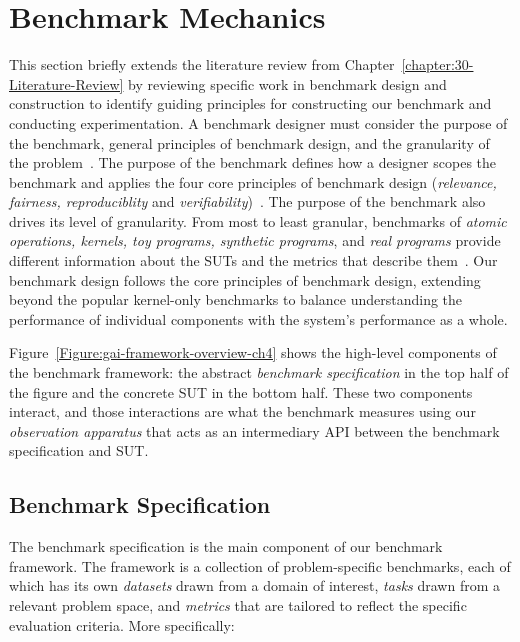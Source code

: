 \section{Benchmark Mechanics}
\label{section:42-GAI-Background}
This section briefly extends the literature review from Chapter~\ref{chapter:30-Literature-Review} by reviewing specific work in benchmark design and construction to identify guiding principles for constructing our benchmark and conducting experimentation. 
A benchmark designer must consider the purpose of the benchmark, general principles of benchmark design, and the granularity of the problem~\cite{Carpinetti2002}.
The purpose of the benchmark defines how a designer scopes the benchmark and applies the four core principles of benchmark design (\textit{relevance, fairness, reproduciblity} and \textit{verifiability})~\cite{Huppler2009, Kistowski2015}. 
The purpose of the benchmark also drives its level of granularity. 
From most to least granular, benchmarks of \textit{atomic operations, kernels, toy programs, synthetic programs}, and \textit{real programs} provide different information about the \ac{SUT}s and the metrics that describe them~\cite{Hennessy2019}.
Our \gai benchmark design follows the core principles of benchmark design, extending beyond the popular kernel-only benchmarks to balance understanding the performance of individual components with the system's performance as a whole.



Figure~\ref{Figure:gai-framework-overview-ch4} shows the high-level components of the \gai benchmark framework: the abstract \textit{benchmark specification} in the top half of the figure and the concrete \ac{SUT} in the bottom half. 
These two components interact, and those interactions are what the benchmark measures using our \textit{observation apparatus} that acts as an intermediary \ac{API} between the benchmark specification and \ac{SUT}. 

\subsection{Benchmark Specification}
The benchmark specification is the main component of our \gai benchmark framework. 
The framework is a collection of problem-specific benchmarks, each of which has its own \textit{datasets} drawn from a domain of interest, \textit{tasks} drawn from a relevant problem space, and \textit{metrics} that are tailored to reflect the specific evaluation criteria.
More specifically:

